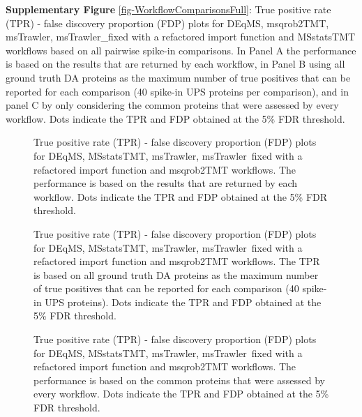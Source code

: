 \documentclass[
  letterpaper,
  DIV=11,
  numbers=noendperiod]{scrartcl}
\begin{document}
\textbf{Supplementary Figure }\ref{fig-WorkflowComparisonsFull}: True
positive rate (TPR) - false discovery proportion (FDP) plots for DEqMS,
msqrob2TMT, msTrawler, msTrawler\_fixed with a refactored import
function and MSstatsTMT workflows based on all pairwise spike-in
comparisons. In Panel A the performance is based on the results that are
returned by each workflow, in Panel B using all ground truth DA proteins
as the maximum number of true positives that can be reported for each
comparison (40 spike-in UPS proteins per comparison), and in panel C by
only considering the common proteins that were assessed by every
workflow. Dots indicate the TPR and FDP obtained at the 5\% FDR
threshold.

\begin{figure}[H]


\caption{\label{fig-WorkflowComparisonsSeparateA}True positive rate
(TPR) - false discovery proportion (FDP) plots for DEqMS, MSstatsTMT,
msTrawler, msTrawler~fixed with a refactored import function and
msqrob2TMT workflows. The performance is based on the results that are
returned by each workflow. Dots indicate the TPR and FDP obtained at the
5\% FDR threshold.}

\end{figure}%

\begin{figure}[H]


\caption{\label{fig-WorkflowComparisonsSeparateB}True positive rate
(TPR) - false discovery proportion (FDP) plots for DEqMS, MSstatsTMT,
msTrawler, msTrawler~fixed with a refactored import function and
msqrob2TMT workflows. The TPR is based on all ground truth DA proteins
as the maximum number of true positives that can be reported for each
comparison (40 spike-in UPS proteins). Dots indicate the TPR and FDP
obtained at the 5\% FDR threshold.}

\end{figure}%

\begin{figure}[H]


\caption{\label{fig-WorkflowComparisonsSeparateC}True positive rate
(TPR) - false discovery proportion (FDP) plots for DEqMS, MSstatsTMT,
msTrawler, msTrawler~fixed with a refactored import function and
msqrob2TMT workflows. The performance is based on the common proteins
that were assessed by every workflow. Dots indicate the TPR and FDP
obtained at the 5\% FDR threshold.}

\end{figure}%
\end{document}
